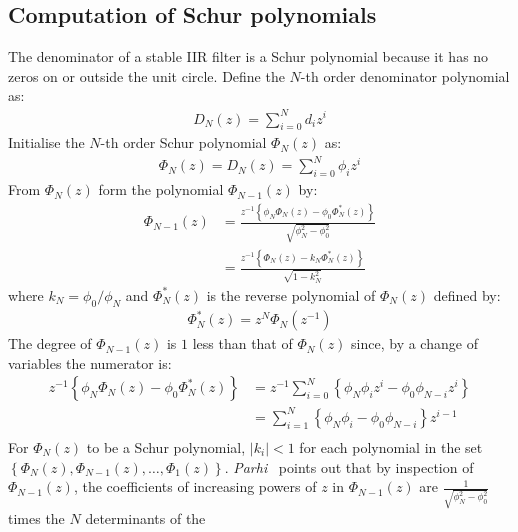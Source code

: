 \documentclass[a4paper,twoside,10pt,english]{report}
\begin{document}
\subsection{Computation of Schur polynomials}
The denominator of a stable IIR filter is a Schur polynomial because
it has no zeros on or outside the unit circle. Define the $N$-th order
denominator polynomial as:
\begin{align*}
D_{N}\left(z\right)=\sum_{i=0}^{N}d_{i}z^{i}
\end{align*}
Initialise the $N$-th order Schur polynomial $\Phi_{N}\left(z\right)$
as:
\begin{align*}
\Phi_{N}\left(z\right)=D_{N}\left(z\right)=\sum_{i=0}^{N}\phi_{i}z^{i}
\end{align*}
From $\Phi_{N}\left(z\right)$ form the polynomial $\Phi_{N-1}\left(z\right)$ by:
\begin{align*}
\Phi_{N-1}\left(z\right) & = \frac{z^{-1}\left\{ \phi_{N}\Phi_{N}\left(z\right)-\phi_{0}\Phi_{N}^{*}\left(z\right)\right\} }{\sqrt{\phi_{N}^{2}-\phi_{0}^{2}}}\\
 & = \frac{z^{-1}\left\{ \Phi_{N}\left(z\right)-k_{N}\Phi_{N}^{*}\left(z\right)\right\} }{\sqrt{1-k_{N}^{2}}}
\end{align*}
where $k_{N}=\phi_{0}/\phi_{N}$ and $\Phi_{N}^{*}\left(z\right)$
is the reverse polynomial of $\Phi_{N}\left(z\right)$ defined by:
\begin{align*}
\Phi_{N}^{*}\left(z\right)=z^{N}\Phi_{N}\left(z^{-1}\right)
\end{align*}
The degree of $\Phi_{N-1}\left(z\right)$ is $1$ less than that of
$\Phi_{N}\left(z\right)$ since, by a change of variables the numerator
is:
\begin{align*}
 z^{-1}\left\{ \phi_{N}\Phi_{N}\left(z\right)-\phi_{0}\Phi_{N}^{*}\left(z\right)\right\}
& = z^{-1}\sum^{N}_{i=0}\left\{\phi_{N}\phi_{i}z^{i}-\phi_{0}\phi_{N-i}z^{i}\right\}\\
& = \sum^{N}_{i=1}\left\{\phi_{N}\phi_{i}-\phi_{0}\phi_{N-i}\right\}z^{i-1}\\
\end{align*}
For $\Phi_{N}\left(z\right)$ to be a Schur polynomial, $\left|k_{i}\right|<1$
for each polynomial in the set $\left\{ \Phi_{N}\left(z\right),\Phi_{N-1}\left(z\right),\ldots,\Phi_{1}\left(z\right)\right\} $. 
\emph{Parhi}~\cite[Equation 12.6]{Parhi_VLSIDigitalSignalProcessingSystems}
 points out that by inspection of $\Phi_{N-1}\left(z\right)$, the coefficients
of increasing powers of $z$ in $\Phi_{N-1}\left(z\right)$ are 
$\frac{1}{\sqrt{\phi^{2}_{N}-\phi^{2}_{0}}}$ times the $N$ determinants of the
\end{document}
